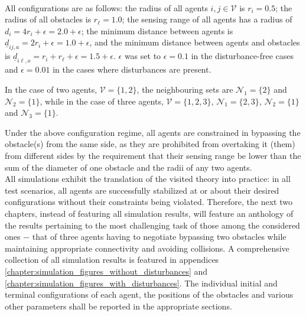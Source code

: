 \noindent{}\\[2.5ex]

All configurations are as follows: the radius of all agents
$i,j \in \mathcal{V}$ is $r_i = 0.5$; the radius of all obstacles is
$r_{\ell} = 1.0$; the sensing range of all agents has a radius of
$d_i = 4r_i + \epsilon = 2.0 + \epsilon$; the minimum distance between agents
is $\underline{d}_{ij,a} = 2r_i + \epsilon = 1.0 + \epsilon$, and the minimum
distance between agents and obstacles is
$\underline{d}_{i\ell,o} = r_i + r_{\ell} + \epsilon = 1.5 + \epsilon$.
$\epsilon$ was set to $\epsilon = 0.1$ in the disturbance-free cases and
$\epsilon = 0.01$ in the cases where disturbances are present.

In the case of two agents, $\mathcal{V} = \{1,2\}$,
the neighbouring sets are $\mathcal{N}_1 = \{2\}$
and $\mathcal{N}_2 = \{1\}$, while in the case of three agents,
$\mathcal{V} = \{1,2,3\}$, $\mathcal{N}_1 = \{2,3\}$,
$\mathcal{N}_2 = \{1\}$ and $\mathcal{N}_3 = \{1\}$.

Under the above configuration regime, all agents are constrained in bypassing
the obstacle(s) from the same side, as they are prohibited from overtaking it
(them) from different sides by the requirement that their sensing range be
lower than the sum of the diameter of one obstacle and the radii of any two
agents.\\[2.5ex]

All simulations exhibit the translation of the visited theory into practice:
in all test scenarios, all agents are successfully stabilized at or about
their desired configurations without their constraints being violated.
Therefore, the next two chapters, instead of featuring all simulation results,
will feature an anthology of the results pertaining to the most challenging task
of those among the considered ones $-$ that of three agents having to negotiate
bypassing two obstacles while maintaining appropriate connectivity and avoiding
collisions. A comprehensive collection of all simulation results is featured in
appendices \ref{chapter:simulation_figures_without_disturbances} and
\ref{chapter:simulation_figures_with_disturbances}. The individual initial
and terminal configurations of each agent, the positions of the obstacles and
various other parameters shall be reported in the appropriate sections.
